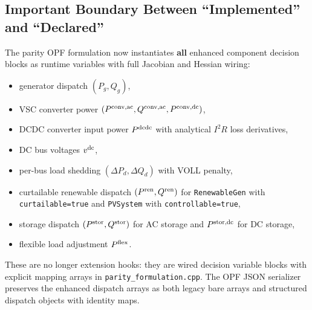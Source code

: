\subsection{Important Boundary Between ``Implemented'' and ``Declared''}

The parity OPF formulation now instantiates \textbf{all} enhanced component
decision blocks as runtime variables with full Jacobian and Hessian wiring:
\begin{itemize}
  \item generator dispatch \((P_g, Q_g)\),
  \item VSC converter power \((P^{\mathrm{conv,ac}}, Q^{\mathrm{conv,ac}}, P^{\mathrm{conv,dc}})\),
  \item DCDC converter input power \(P^{\mathrm{dcdc}}\) with analytical \(I^2R\) loss derivatives,
  \item DC bus voltages \(v^{\mathrm{dc}}\),
  \item per-bus load shedding \((\Delta P_d, \Delta Q_d)\) with VOLL penalty,
  \item curtailable renewable dispatch \((P^{\mathrm{ren}}, Q^{\mathrm{ren}})\) for \texttt{RenewableGen} with \texttt{curtailable=true} and \texttt{PVSystem} with \texttt{controllable=true},
  \item storage dispatch \((P^{\mathrm{stor}}, Q^{\mathrm{stor}})\) for AC storage and \(P^{\mathrm{stor,dc}}\) for DC storage,
  \item flexible load adjustment \(P^{\mathrm{flex}}\).
\end{itemize}
These are no longer extension hooks: they are wired decision variable blocks
with explicit mapping arrays in \texttt{parity\_formulation.cpp}.  The OPF JSON
serializer preserves the enhanced dispatch arrays as both legacy bare arrays
and structured dispatch objects with identity maps.
